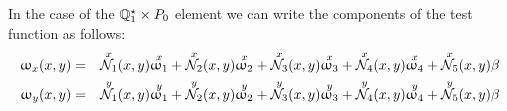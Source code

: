 In the case of the ${{\mathbb{Q}}}_1^\star \times P_0$ element we can write the
components of the test function as follows:
\begin{eqnarray}
\upomega_x(x,y) &=& 
\overset{\tiny x}{{\mathcal{N}}_1}(x,y) \overset{\tiny x}{\upomega_1}+
\overset{\tiny x}{{\mathcal{N}}_2}(x,y) \overset{\tiny x}{\upomega_2}+
\overset{\tiny x}{{\mathcal{N}}_3}(x,y) \overset{\tiny x}{\upomega_3}+
\overset{\tiny x}{{\mathcal{N}}_4}(x,y) \overset{\tiny x}{\upomega_4}+
\overset{\tiny x}{{\mathcal{N}}_5}(x,y) \beta \\
\upomega_y(x,y) &=& 
\overset{\tiny y}{{\mathcal{N}}_1}(x,y) \overset{\tiny y}{\upomega_1}+
\overset{\tiny y}{{\mathcal{N}}_2}(x,y) \overset{\tiny y}{\upomega_2}+
\overset{\tiny y}{{\mathcal{N}}_3}(x,y) \overset{\tiny y}{\upomega_3}+
\overset{\tiny y}{{\mathcal{N}}_4}(x,y) \overset{\tiny y}{\upomega_4}+
\overset{\tiny y}{{\mathcal{N}}_5}(x,y) \beta 
\end{eqnarray}

